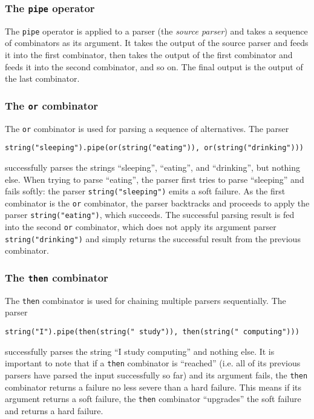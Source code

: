 \subsubsection{The \lstinline{pipe} operator}
The \lstinline{pipe} operator \cite{parjs:pipe} is applied to a parser (the \textit{source parser}) and takes a sequence of combinators as its argument. It takes the output of the source parser and feeds it into the first combinator, then takes the output of the first combinator and feeds it into the second combinator, and so on. The final output is the output of the last combinator.

\subsubsection{The \lstinline{or} combinator}
The \lstinline{or} combinator \cite{parjs:or} is used for parsing a sequence of alternatives. The parser
\begin{center}
    \lstinline{string("sleeping").pipe(or(string("eating")), or(string("drinking")))}
\end{center}
successfully parses the strings ``sleeping'', ``eating'', and ``drinking'', but nothing else. When trying to parse ``eating'', the parser first tries to parse ``sleeping'' and fails softly: the parser \lstinline{string("sleeping")} emits a soft failure. As the first combinator is the \lstinline{or} combinator, the parser backtracks and proceeds to apply the parser \lstinline{string("eating")}, which succeeds. The successful parsing result is fed into the second \lstinline{or} combinator, which does not apply its argument parser \lstinline{string("drinking")} and simply returns the successful result from the previous combinator.

\subsubsection{The \lstinline{then} combinator}
The \lstinline{then} combinator \cite{parjs:then} is used for chaining multiple parsers sequentially. The parser
\begin{center}
    \lstinline{string("I").pipe(then(string(" study")), then(string(" computing")))}
\end{center}
successfully parses the string ``I study computing'' and nothing else. It is important to note that if a \lstinline{then} combinator is ``reached'' (i.e. all of its previous parsers have parsed the input successfully so far) and its argument fails, the \lstinline{then} combinator returns a failure no less severe than a hard failure. This means if its argument returns a soft failure, the \lstinline{then} combinator ``upgrades'' the soft failure and returns a hard failure.

